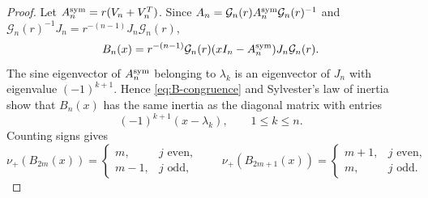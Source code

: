 \documentclass[12pt,anonymous]{iopjournal}
\numberwithin{equation}{section}
\theoremstyle{remark}
\begin{document}
\begin{proof}
Let \(A_n^{\rm sym}=r(V_n+V_n^T)\).  Since
\(A_n=\mathcal G_n(r)A_n^{\rm sym}\mathcal G_n(r)^{-1}\) and
\(\mathcal G_n(r)^{-1}J_n
=r^{-(n-1)}J_n\mathcal G_n(r)\),
\begin{equation}\label{eq:B-congruence}
 B_n(x)=r^{-(n-1)}\mathcal G_n(r)(xI_n-A_n^{\rm sym})
 J_n\mathcal G_n(r).
\end{equation}
The sine eigenvector of \(A_n^{\rm sym}\) belonging to \(\lambda_k\) is an
eigenvector of \(J_n\) with eigenvalue \((-1)^{k+1}\).  Hence
\eqref{eq:B-congruence} and Sylvester's law of inertia show that
\(B_n(x)\) has the same inertia as the diagonal matrix with entries
\[
 (-1)^{k+1}(x-\lambda_k),\qquad 1\leq k\leq n.
\]
Counting signs gives
\begin{equation}\label{eq:middle-inertia}
 \nu_+(B_{2m}(x))=
 \begin{cases}m,&j\text{ even},\\m-1,&j\text{ odd},\end{cases}
 \qquad
 \nu_+(B_{2m+1}(x))=
 \begin{cases}m+1,&j\text{ even},\\m,&j\text{ odd}.
 \end{cases}
\end{equation}


\end{proof}
\end{document}
